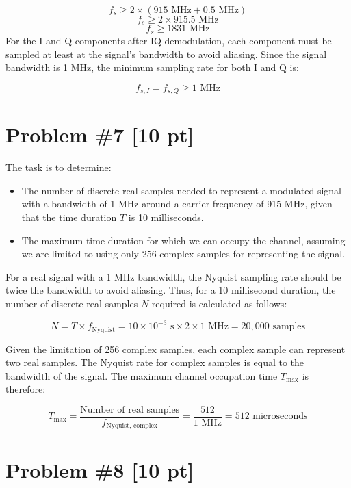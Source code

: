 \documentclass{article}
\begin{document}
\[ f_s \geq 2 \times (915 \text{ MHz} + 0.5 \text{ MHz}) \]
\[ f_s \geq 2 \times 915.5 \text{ MHz} \]
\[ f_s \geq 1831 \text{ MHz} \]
\noindent
For the I and Q components after IQ demodulation, each component must be sampled at least at the signal's bandwidth to avoid aliasing. Since the signal bandwidth is 1 MHz, the minimum sampling rate for both I and Q is:

\[ f_{s,I} = f_{s,Q} \geq 1 \text{ MHz} \]
\newpage

\newpage
\section*{Problem \#7 [10 pt]}

The task is to determine:
\begin{itemize}
    \item The number of discrete real samples needed to represent a modulated signal with a bandwidth of 1 MHz around a carrier frequency of 915 MHz, given that the time duration \( T \) is 10 milliseconds.
    \item The maximum time duration for which we can occupy the channel, assuming we are limited to using only 256 complex samples for representing the signal.
\end{itemize}

For a real signal with a 1 MHz bandwidth, the Nyquist sampling rate should be twice the bandwidth to avoid aliasing. Thus, for a 10 millisecond duration, the number of discrete real samples \( N \) required is calculated as follows:

\[ N = T \times f_{\text{Nyquist}} = 10 \times 10^{-3} \text{ s} \times 2 \times 1 \text{ MHz} = 20,000 \text{ samples} \]

Given the limitation of 256 complex samples, each complex sample can represent two real samples. The Nyquist rate for complex samples is equal to the bandwidth of the signal. The maximum channel occupation time \( T_{\text{max}} \) is therefore:

\[ T_{\text{max}} = \frac{\text{Number of real samples}}{f_{\text{Nyquist, complex}}} = \frac{512}{1 \text{ MHz}} = 512 \text{ microseconds} \]
\newpage
\section*{Problem \#8 [10 pt]}
\end{document}
